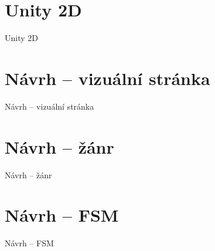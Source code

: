 \documentclass[10pt]{beamer}
\begin{document}
	\begin{frame}[plain]
	\end{frame}
	
	\section{Unity 2D}
	\begin{frame}{Unity 2D}
	\end{frame}
	
	\section{Návrh – vizuální stránka}
	\begin{frame}{Návrh – vizuální stránka}
	\end{frame}
	
	\section{Návrh – žánr}
	\begin{frame}{Návrh – žánr}
	\end{frame}
	
	\section{Návrh – FSM}
	\begin{frame}{Návrh – FSM}
	\end{frame}
	
\end{document}
